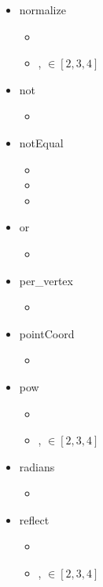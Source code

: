 \documentclass{article}
\begin{document}
\begin{itemize}
\begin{itemize}
\end{itemize}\item normalize \begin{itemize}
\item {}
\item {},  $\in [2, 3, 4]$

\end{itemize}\item not \begin{itemize}
\item {}

\end{itemize}\item notEqual \begin{itemize}
\item {}
\item {}
\item {}

\end{itemize}\item or \begin{itemize}
\item {}

\end{itemize}\item per\_vertex \begin{itemize}
\item {}

\end{itemize}\item pointCoord \begin{itemize}
\item {}

\end{itemize}\item pow \begin{itemize}
\item {}
\item {},  $\in [2, 3, 4]$

\end{itemize}\item radians \begin{itemize}
\item {}

\end{itemize}\item reflect \begin{itemize}
\item {}
\item {},  $\in [2, 3, 4]$


\end{itemize}
\end{itemize}
\end{document}
